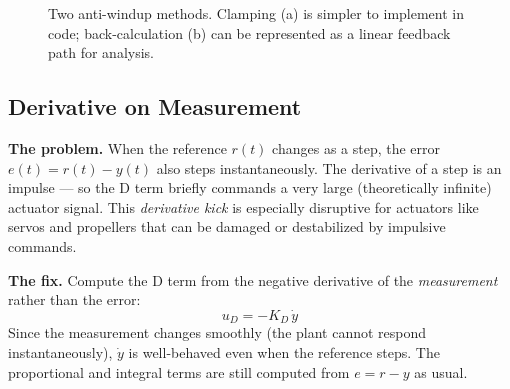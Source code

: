 \documentclass[../../book.tex]{subfiles}
\begin{document}
\begin{figure}[htbp]

\caption{Two anti-windup methods.  Clamping (a) is simpler to implement in
  code; back-calculation (b) can be represented as a linear feedback path
  for analysis.}
\label{fig:antiwindup_both}
\end{figure}

\subsection{Derivative on Measurement}

\textbf{The problem.}
When the reference $r(t)$ changes as a step, the error
$e(t) = r(t) - y(t)$ also steps instantaneously.  The derivative of a step
is an impulse --- so the D term briefly commands a very large (theoretically
infinite) actuator signal.  This \emph{derivative kick} is especially
disruptive for actuators like servos and propellers that can be damaged or
destabilized by impulsive commands.

\textbf{The fix.}
Compute the D term from the negative derivative of the \emph{measurement}
rather than the error:
\[
  u_D = -K_D\,\dot{y}
\]
Since the measurement changes smoothly (the plant cannot respond
instantaneously), $\dot{y}$ is well-behaved even when the reference steps.
The proportional and integral terms are still computed from $e = r - y$ as
usual.
\end{document}

